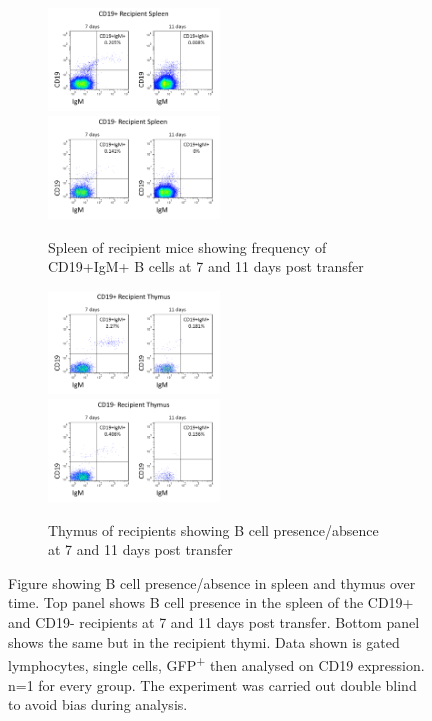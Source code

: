 \begin{figure}
	\begin{subfigure}{\textwidth}
	\includegraphics[width=0.5\textwidth]{Figures/CD19posrecipspleen.png}
	\includegraphics[width=0.5\textwidth]{Figures/CD19negrecipspleen.png}
	\caption{Spleen of recipient mice showing frequency of CD19+IgM+ B cells at 7 and 11 days post transfer}
	\label{subfig:transferspleen}
	\end{subfigure}
	\begin{subfigure}{\textwidth}
	\includegraphics[width=0.5\textwidth]{Figures/CD19posrecipthy.png}
	\includegraphics[width=0.5\textwidth]{Figures/CD19negrecipthy.png}
	\caption{Thymus of recipients showing B cell presence/absence at 7 and 11 days post transfer}
	\label{subfig:transferthymus}
	\end{subfigure}
\caption[Donor B cells are found in the spleen of recipient mice at 4 days post transplant]{Figure showing B cell presence/absence in spleen and thymus over time.
Top panel shows B cell presence in the spleen of the CD19+ and CD19- recipients at 7 and 11 days post transfer.
Bottom panel shows the same but in the recipient thymi.
Data shown is gated lymphocytes, single cells, GFP\textsuperscript{+} then analysed on CD19 expression.
n=1 for every group.
The experiment was carried out double blind to avoid bias during analysis.}
\label{fig:Transfer}
\end{figure}

